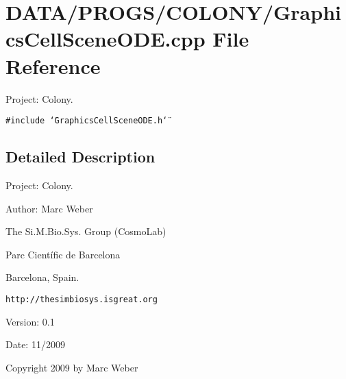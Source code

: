 \section{DATA/PROGS/COLONY/GraphicsCellSceneODE.cpp File Reference}
\label{GraphicsCellSceneODE_8cpp}
Project: Colony. 

{\tt \#include \char`\"{}GraphicsCellSceneODE.h\char`\"{}}\par


\subsection{Detailed Description}
Project: Colony. 

\begin{Desc}
\item[Author:]Marc Weber\par
 The Si.M.Bio.Sys. Group (CosmoLab)\par
 Parc Científic de Barcelona\par
 Barcelona, Spain.\par
 {\tt http://thesimbiosys.isgreat.org} \end{Desc}
\begin{Desc}
\item[Version:]0.1 \end{Desc}
\begin{Desc}
\item[Date:]11/2009\end{Desc}
Copyright 2009 by Marc Weber 